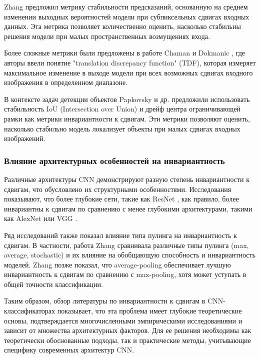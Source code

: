 Zhang \cite{Zhang2019blurpool} предложил метрику стабильности предсказаний, основанную на среднем изменении выходных вероятностей модели при субпиксельных сдвигах входных данных. Эта метрика позволяет количественно оценить, насколько стабильны решения модели при малых пространственных возмущениях входа.

Более сложные метрики были предложены в работе Chaman и Dokmanic \cite{chaman2021truly}, где авторы ввели понятие "translation discrepancy function" (TDF), которая измеряет максимальное изменение в выходе модели при всех возможных сдвигах входного изображения в определенном диапазоне.

В контексте задач детекции объектов Papkovsky и др. \cite{papkovsky2023shift} предложили использовать стабильность IoU (Intersection over Union) и дрейф центра ограничивающей рамки как метрики инвариантности к сдвигам. Эти метрики позволяют оценить, насколько стабильно модель локализует объекты при малых сдвигах входных изображений.

\subsubsection{Влияние архитектурных особенностей на инвариантность}
\label{review:invariance:architectures}

Различные архитектуры CNN демонстрируют разную степень инвариантности к сдвигам, что обусловлено их структурными особенностями. Исследования показывают, что более глубокие сети, такие как ResNet \cite{he2016deep}, как правило, более инвариантны к сдвигам по сравнению с менее глубокими архитектурами, такими как AlexNet или VGG \cite{simonyan2015deep}.

Ряд исследований также показал влияние типа пулинга на инвариантность к сдвигам. В частности, работа Zhang \cite{Zhang2019blurpool} сравнивала различные типы пулинга (max, average, stochastic) и их влияние на обобщающую способность и инвариантность моделей. Zhang \cite{Zhang2019blurpool} позже показал, что average-pooling обеспечивает лучшую инвариантность к сдвигам по сравнению с max-pooling, хотя может уступать в общей точности классификации.

Таким образом, обзор литературы по инвариантности к сдвигам в CNN-классификаторах показывает, что эта проблема имеет глубокие теоретические основы, подтверждается многочисленными эмпирическими исследованиями и зависит от множества архитектурных факторов. Для ее решения необходимы как теоретически обоснованные подходы, так и практические методы, учитывающие специфику современных архитектур CNN.

